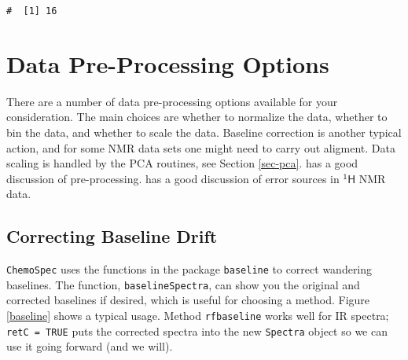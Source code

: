 \documentclass[letter,10pt,twocolumn,twoside,printwatermark=false]{pinp}
\begin{document}
\begin{Shaded}
\begin{Highlighting}[]
\NormalTok{(}\OperatorTok{$}
\end{Highlighting}
\end{Shaded}

\begin{ShadedResult}
\begin{verbatim}
#  [1] 16
\end{verbatim}
\end{ShadedResult}

\hypertarget{data-pre-processing-options}{%
\section{Data Pre-Processing
Options}\label{data-pre-processing-options}}

There are a number of data pre-processing options available for your
consideration. The main choices are whether to normalize the data,
whether to bin the data, and whether to scale the data. Baseline
correction is another typical action, and for some NMR data sets one
might need to carry out aligment. Data scaling is handled by the PCA
routines, see Section \ref{sec-pca}. \cite{Engel2013} has a good
discussion of pre-processing. \cite{Karakach2009} has a good discussion
of error sources in \(\mathsf{^{1}H}\) NMR data.

\hypertarget{correcting-baseline-drift}{%
\subsection{Correcting Baseline Drift}\label{correcting-baseline-drift}}

\texttt{ChemoSpec} uses the functions in the package \texttt{baseline}
to correct wandering baselines. The function, \texttt{baselineSpectra},
can show you the original and corrected baselines if desired, which is
useful for choosing a method. Figure \ref{baseline} shows a typical
usage. Method \texttt{rfbaseline} works well for IR spectra;
\texttt{retC = TRUE} puts the corrected spectra into the new
\texttt{Spectra} object so we can use it going forward (and we will).

\begin{Shaded}
\begin{Highlighting}[]
\StringTok{ }
   \NormalTok{,}
   \NormalTok{,}
   \NormalTok{)}
\end{Highlighting}
\end{Shaded}
\end{document}
